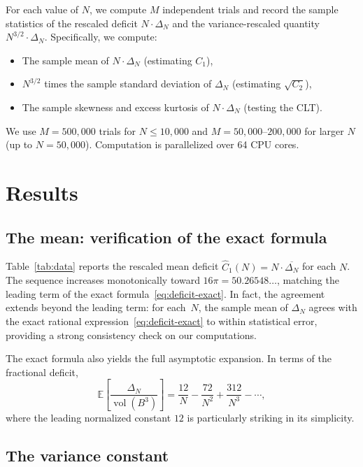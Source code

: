 \documentclass[11pt]{article}
\begin{document}
For each value of $N$, we compute $M$ independent trials and record
the sample statistics of the rescaled deficit $N \cdot \Delta_N$ and
the variance-rescaled quantity $N^{3/2} \cdot \Delta_N$.  Specifically,
we compute:
\begin{itemize}
  \item The sample mean of $N \cdot \Delta_N$ (estimating $C_1$),
  \item $N^{3/2}$ times the sample standard deviation of $\Delta_N$
    (estimating $\sqrt{C_2}$),
  \item The sample skewness and excess kurtosis of $N \cdot \Delta_N$
    (testing the CLT).
\end{itemize}

We use $M = 500{,}000$ trials for $N \le 10{,}000$ and $M =
50{,}000$--$200{,}000$ for larger $N$ (up to $N = 50{,}000$).
Computation is parallelized over 64 CPU cores.

\section{Results}

\subsection{The mean: verification of the exact formula}

Table~\ref{tab:data} reports the rescaled mean deficit $\hat{C}_1(N)
= N \cdot \overline{\Delta_N}$ for each $N$.  The sequence increases
monotonically toward $16\pi = 50.26548\ldots$, matching the
leading term of the exact formula~\eqref{eq:deficit-exact}.  In
fact, the agreement extends beyond the leading term: for each~$N$,
the sample mean of $\Delta_N$ agrees with the exact rational
expression~\eqref{eq:deficit-exact} to within statistical error,
providing a strong consistency check on our computations.

The exact formula also yields the full asymptotic expansion.
In terms of the fractional deficit,
\[
  \mathbb{E}\!\left[\frac{\Delta_N}{\operatorname{vol}(B^3)}\right]
  = \frac{12}{N} - \frac{72}{N^2} + \frac{312}{N^3} - \cdots,
\]
where the leading normalized constant $12$ is particularly striking
in its simplicity.

\subsection{The variance constant}
\end{document}
